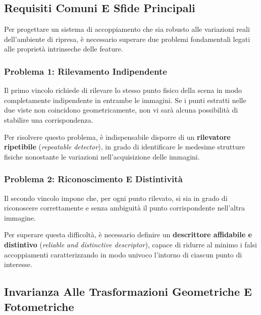 ﻿\documentclass[11pt, a4paper]{article}
\begin{document}
\subsection{Requisiti Comuni E Sfide Principali}

Per progettare un sistema di accoppiamento che sia robusto alle variazioni reali dell'ambiente di ripresa, è necessario superare due problemi fondamentali legati alle proprietà intrinseche delle feature.

\subsubsection{Problema 1: Rilevamento Indipendente}
Il primo vincolo richiede di rilevare lo stesso punto fisico della scena in modo completamente indipendente in entrambe le immagini. Se i punti estratti nelle due viste non coincidono geometricamente, non vi sarà alcuna possibilità di stabilire una corrispondenza.


Per risolvere questo problema, è indispensabile disporre di un \textbf{rilevatore ripetibile} (\emph{repeatable detector}), in grado di identificare le medesime strutture fisiche nonostante le variazioni nell'acquisizione delle immagini.

\subsubsection{Problema 2: Riconoscimento E Distintività}
Il secondo vincolo impone che, per ogni punto rilevato, si sia in grado di riconoscere correttamente e senza ambiguità il punto corrispondente nell'altra immagine.


Per superare questa difficoltà, è necessario definire un \textbf{descrittore affidabile e distintivo} (\emph{reliable and distinctive descriptor}), capace di ridurre al minimo i falsi accoppiamenti caratterizzando in modo univoco l'intorno di ciascun punto di interesse.

\subsection{Invarianza Alle Trasformazioni Geometriche E Fotometriche}
\end{document}
